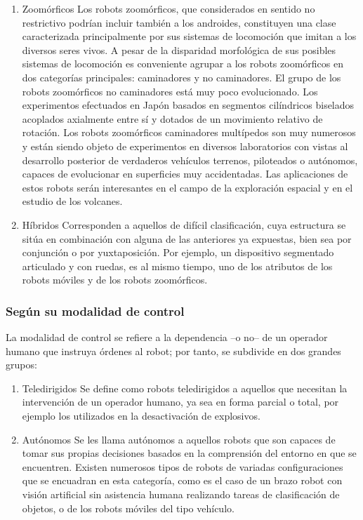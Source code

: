 \begin{enumerate}
	\item Zoomórficos
	Los robots zoomórficos, que considerados en sentido no restrictivo podrían incluir también a los androides, constituyen una clase caracterizada principalmente por sus sistemas de locomoción que imitan a los diversos seres vivos. A pesar de la disparidad morfológica de sus posibles sistemas de locomoción es conveniente agrupar a los robots zoomórficos en dos categorías principales: caminadores y no caminadores. El grupo de los robots zoomórficos no caminadores está muy poco evolucionado. Los experimentos efectuados en Japón basados en segmentos cilíndricos biselados acoplados axialmente entre sí y dotados de un movimiento relativo de rotación. Los robots zoomórficos caminadores multípedos son muy numerosos y están siendo objeto de experimentos en diversos laboratorios con vistas al desarrollo posterior de verdaderos vehículos terrenos, piloteados o autónomos, capaces de evolucionar en superficies muy accidentadas. Las aplicaciones de estos robots serán interesantes en el campo de la exploración espacial y en el estudio de los volcanes.

	\item Híbridos
	Corresponden a aquellos de difícil clasificación, cuya estructura se sitúa en combinación con alguna de las anteriores ya expuestas, bien sea por conjunción o por yuxtaposición. Por ejemplo, un dispositivo segmentado articulado y con ruedas, es al mismo tiempo, uno de los atributos de los robots móviles y de los robots zoomórficos.
\end{enumerate}

\subsubsection{Según su modalidad de control}
La modalidad de control se refiere a la dependencia –o no– de un operador humano que instruya órdenes al robot; por tanto, se subdivide en dos grandes grupos:

\begin{enumerate}
	\itemsep1pt \parskip1pt 
	\item Teledirigidos
	Se define como robots teledirigidos a aquellos que necesitan la intervención de un operador humano, ya sea en forma parcial o total, por ejemplo los utilizados en la desactivación de explosivos.
	\item Autónomos
	Se les llama autónomos a aquellos robots que son capaces de tomar sus propias decisiones basados en la comprensión del entorno en que se encuentren. Existen numerosos tipos de robots de variadas configuraciones que se encuadran en esta categoría, como es el caso de un brazo robot con visión artificial sin asistencia humana realizando tareas de clasificación de objetos, o de los robots móviles del tipo vehículo.
\end{enumerate}

